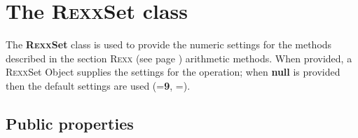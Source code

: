 \section{The R\textsc{exx}Set class}\label{refnlrset}
 
The \textbf{R\textsc{exx}Set} class is used to provide the numeric settings for
the methods described in the section R\textsc{exx} (see page \pageref{refrexxops}) 
arithmetic methods.
When provided, a R\textsc{exx}Set Object supplies the  settings
for the operation; when \textbf{null} is provided then the default
settings are used (=\textbf{9},
=).
\subsection{Public properties}\label{publicproperties}
 
